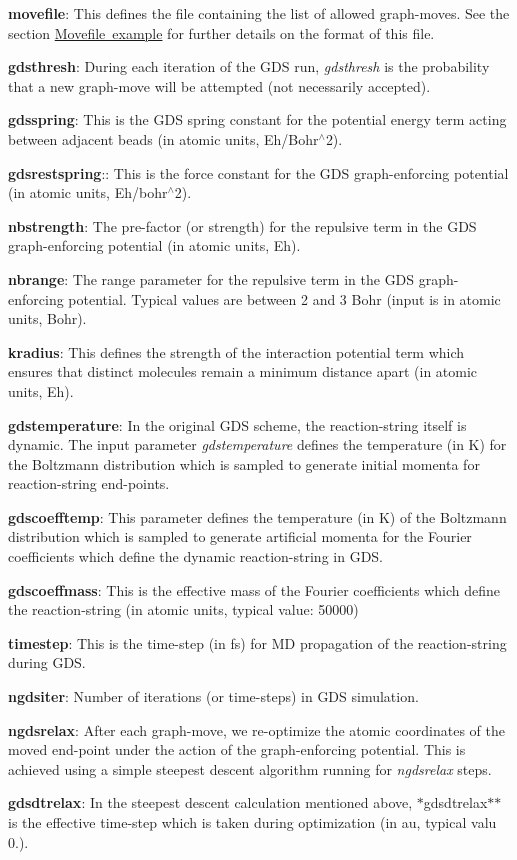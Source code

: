 \begin{DoxyItemize}
\item {\bfseries movefile}\+: This defines the file containing the list of allowed graph-\/moves. See the section \mbox{\hyperlink{moves}{Movefile example}} for further details on the format of this file.
\item {\bfseries gdsthresh}\+: During each iteration of the G\+DS run, {\itshape gdsthresh} is the probability that a new graph-\/move will be attempted (not necessarily accepted).
\item {\bfseries gdsspring}\+: This is the G\+DS spring constant for the potential energy term acting between adjacent beads (in atomic units, Eh/\+Bohr$^\wedge$2).
\item {\bfseries gdsrestspring}\+:\+: This is the force constant for the G\+DS graph-\/enforcing potential (in atomic units, Eh/bohr$^\wedge$2).
\item {\bfseries nbstrength}\+: The pre-\/factor (or strength) for the repulsive term in the G\+DS graph-\/enforcing potential (in atomic units, Eh).
\item {\bfseries nbrange}\+: The range parameter for the repulsive term in the G\+DS graph-\/enforcing potential. Typical values are between 2 and 3 Bohr (input is in atomic units, Bohr).
\item {\bfseries kradius}\+: This defines the strength of the interaction potential term which ensures that distinct molecules remain a minimum distance apart (in atomic units, Eh).
\item {\bfseries gdstemperature}\+: In the original G\+DS scheme, the reaction-\/string itself is dynamic. The input parameter {\itshape gdstemperature} defines the temperature (in K) for the Boltzmann distribution which is sampled to generate initial momenta for reaction-\/string end-\/points.
\item {\bfseries gdscoefftemp}\+: This parameter defines the temperature (in K) of the Boltzmann distribution which is sampled to generate artificial momenta for the Fourier coefficients which define the dynamic reaction-\/string in G\+DS.
\item {\bfseries gdscoeffmass}\+: This is the effective mass of the Fourier coefficients which define the reaction-\/string (in atomic units, typical value\+: 50000)
\item {\bfseries timestep}\+: This is the time-\/step (in fs) for MD propagation of the reaction-\/string during G\+DS.
\item {\bfseries ngdsiter}\+: Number of iterations (or time-\/steps) in G\+DS simulation.
\item {\bfseries ngdsrelax}\+: After each graph-\/move, we re-\/optimize the atomic coordinates of the moved end-\/point under the action of the graph-\/enforcing potential. This is achieved using a simple steepest descent algorithm running for {\itshape ngdsrelax} steps.
\item {\bfseries gdsdtrelax}\+: In the steepest descent calculation mentioned above, $\ast$gdsdtrelax$\ast$$\ast$ is the effective time-\/step which is taken during optimization (in au, typical valu 0.).
\end{DoxyItemize}

